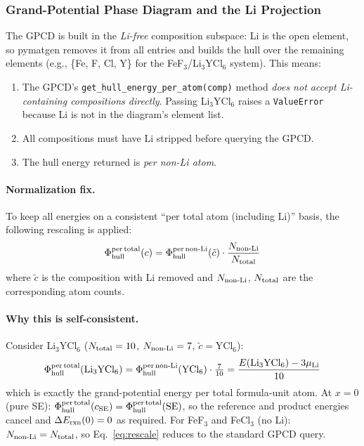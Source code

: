 \documentclass[11pt,letterpaper]{article}
\begin{document}
\subsubsection{Grand-Potential Phase Diagram and the Li Projection}

The GPCD is built in the \emph{Li-free} composition subspace: Li is the
open element, so pymatgen removes it from all entries and builds the hull
over the remaining elements (e.g., \{Fe, F, Cl, Y\} for the
FeF$_3$/Li$_3$YCl$_6$ system). This means:

\begin{enumerate}
  \item The GPCD's \texttt{get\_hull\_energy\_per\_atom(comp)} method
        \emph{does not accept Li-containing compositions directly}.
        Passing Li$_3$YCl$_6$ raises a \texttt{ValueError} because Li
        is not in the diagram's element list.
  \item All compositions must have Li stripped before querying the GPCD.
  \item The hull energy returned is \emph{per non-Li atom}.
\end{enumerate}

\paragraph{Normalization fix.}
To keep all energies on a consistent ``per total atom (including Li)''
basis, the following rescaling is applied:
\begin{equation}
  \Phi_{\rm hull}^{\rm per\,total}(c)
  = \Phi_{\rm hull}^{\rm per\,non\text{-}Li}(\tilde{c})
    \cdot \frac{N_{\rm non\text{-}Li}}{N_{\rm total}}
  \label{eq:rescale}
\end{equation}
where $\tilde{c}$ is the composition with Li removed and $N_{\rm non\text{-}Li}$,
$N_{\rm total}$ are the corresponding atom counts.

\paragraph{Why this is self-consistent.}
Consider Li$_3$YCl$_6$ ($N_{\rm total}=10$, $N_{\rm non\text{-}Li}=7$,
$\tilde{c}=\text{YCl}_6$):
\begin{equation*}
  \Phi_{\rm hull}^{\rm per\,total}(\text{Li}_3\text{YCl}_6)
  = \Phi_{\rm hull}^{\rm per\,non\text{-}Li}(\text{YCl}_6) \cdot \tfrac{7}{10}
  = \frac{E(\text{Li}_3\text{YCl}_6) - 3\mu_{\rm Li}}{10}
\end{equation*}
which is exactly the grand-potential energy per total formula-unit atom.
At $x=0$ (pure SE): $\Phi_{\rm hull}^{\rm per\,total}(c_{\rm SE}) = \Phi_{\rm hull}^{\rm per\,total}(\text{SE})$,
so the reference and product energies cancel and $\Delta E_{\rm rxn}(0)=0$ as required.
For FeF$_3$ and FeCl$_3$ (no Li): $N_{\rm non\text{-}Li}=N_{\rm total}$,
so Eq.~\eqref{eq:rescale} reduces to the standard GPCD query.
\end{document}

